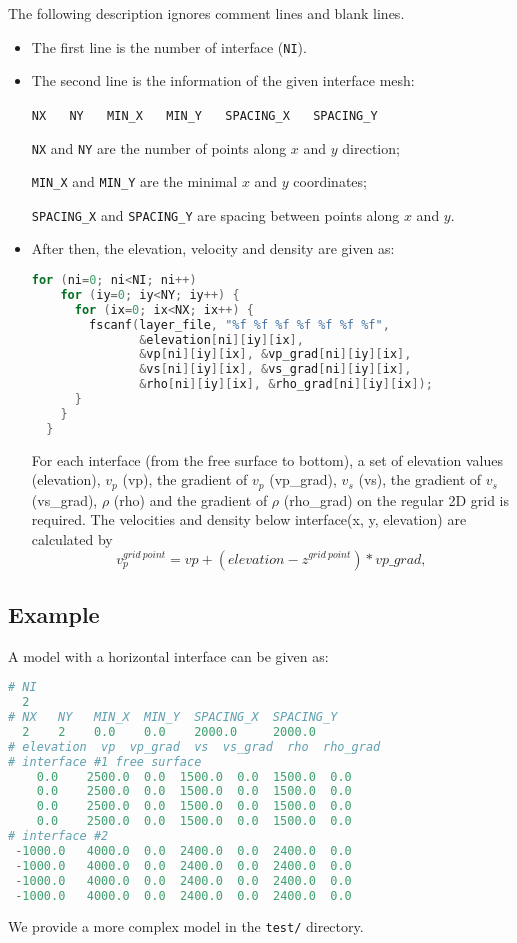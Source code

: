 The following description ignores comment lines and blank lines.
\begin{itemize}
 \item The first line is the number of interface (\texttt{NI}).
 \item {The second line is the information of the given interface mesh:
  
  \texttt{NX} ~~ \texttt{NY} ~~ \texttt{MIN\_X} ~~ \texttt{MIN\_Y} ~~ \texttt{SPACING\_X} ~~ \texttt{SPACING\_Y}

  \texttt{NX} and \texttt{NY} are the number of points along $x$ and $y$ direction;

  \texttt{MIN\_X} and \texttt{MIN\_Y} are the minimal $x$ and $y$ coordinates;

  \texttt{SPACING\_X} and \texttt{SPACING\_Y} are spacing between points along $x$ and $y$.
 }
 \item {
  After then, the elevation, velocity and density are given as:
  \begin{lstlisting}[language = C]
  for (ni=0; ni<NI; ni++)
    for (iy=0; iy<NY; iy++) {
      for (ix=0; ix<NX; ix++) { 
        fscanf(layer_file, "%f %f %f %f %f %f %f", 
               &elevation[ni][iy][ix],
               &vp[ni][iy][ix], &vp_grad[ni][iy][ix],
               &vs[ni][iy][ix], &vs_grad[ni][iy][ix],
               &rho[ni][iy][ix], &rho_grad[ni][iy][ix]);
      }
    }
  }
  \end{lstlisting}
 }
 For each interface (from the free surface to bottom), a set of elevation values (elevation),
 $v_p$ (vp), the gradient of $v_p$ (vp\_grad), $v_s$ (vs), the gradient of $v_s$ (vs\_grad), $\rho$ (rho) and the gradient of $\rho$ (rho\_grad) on the regular 2D grid is required. The velocities and density below interface(x, y, elevation) are calculated by
 \begin{equation*}
    v_p^{grid~point} = vp + (elevation-z^{grid~point}) * vp\_grad,
 \end{equation*} 
\end{itemize}

\subsection{Example}

A model with a horizontal interface can be given as:

\begin{lstlisting}[language=python, title=test.md3lay, frame=tb]
# NI
  2
# NX   NY   MIN_X  MIN_Y  SPACING_X  SPACING_Y 
  2    2    0.0    0.0    2000.0     2000.0
# elevation  vp  vp_grad  vs  vs_grad  rho  rho_grad
# interface #1 free surface
    0.0    2500.0  0.0  1500.0  0.0  1500.0  0.0   
    0.0    2500.0  0.0  1500.0  0.0  1500.0  0.0
    0.0    2500.0  0.0  1500.0  0.0  1500.0  0.0
    0.0    2500.0  0.0  1500.0  0.0  1500.0  0.0
# interface #2 
 -1000.0   4000.0  0.0  2400.0  0.0  2400.0  0.0   
 -1000.0   4000.0  0.0  2400.0  0.0  2400.0  0.0
 -1000.0   4000.0  0.0  2400.0  0.0  2400.0  0.0
 -1000.0   4000.0  0.0  2400.0  0.0  2400.0  0.0 
\end{lstlisting}
We provide a more complex model in the \texttt{test/} directory.

